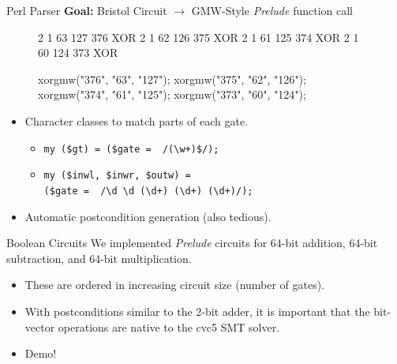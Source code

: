 \documentclass{beamer}
\begin{document}
\begin{frame}[fragile]{Perl Parser}
    \textbf{Goal:} Bristol Circuit $\longrightarrow$ GMW-Style \textit{Prelude} function call
    \begin{figure}
        \begin{minipage}{.5\textwidth}
            \begin{verbatimtab}%
2 1 63 127 376 XOR
2 1 62 126 375 XOR
2 1 61 125 374 XOR
2 1 60 124 373 XOR
            \end{verbatimtab}%
        \end{minipage}%
        \begin{minipage}{.5\textwidth}
            \begin{verbatimtab}%
xorgmw("376", "63", "127");
xorgmw("375", "62", "126");
xorgmw("374", "61", "125");
xorgmw("373", "60", "124");
            \end{verbatimtab}%
        \end{minipage}
    \end{figure}
    \begin{itemize}
    \item Character classes to match parts of each gate.
        \begin{itemize}
            \item \texttt{my (\$gt) = (\$gate =~ /(\textbackslash w+)\$/);} %
            \item \texttt{my (\$inwl, \$inwr, \$outw) = \\ %
            (\$gate =~ /\textbackslash d \textbackslash d (\textbackslash d+) (\textbackslash d+) (\textbackslash d+)/);}
        \end{itemize}
    \item Automatic postcondition generation (also tedious).\\ 
    \end{itemize}
\end{frame}
\begin{frame}{Boolean Circuits}
    We implemented \textit{Prelude} circuits for 64-bit addition, 64-bit subtraction, and 64-bit multiplication.
    \begin{itemize}
    \item These are ordered in increasing circuit size (number of gates).
    \item With postconditions similar to the 2-bit adder, it is important that the bit-vector operations are native to the cvc5 SMT solver.
    \item Demo!
    \end{itemize}
\end{frame}
\end{document}
